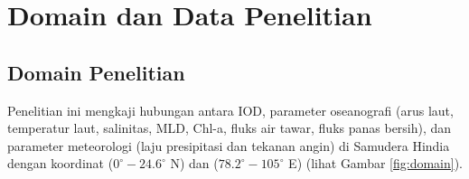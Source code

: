 \vspace{1.5pc}
\section[Domain dan Data Penelitian]{Domain dan Data Penelitian}
\begin{spacing}{1.5}
	\subsection[Domain Penelitian]{Domain Penelitian}
	Penelitian ini mengkaji hubungan antara IOD, parameter oseanografi (arus laut, temperatur laut, salinitas, MLD, Chl-a, fluks air tawar, fluks panas bersih), dan parameter meteorologi (laju presipitasi dan tekanan angin) di Samudera Hindia dengan koordinat ($0^\circ-24.6^\circ$ N) dan ($78.2^\circ-105^\circ$ E) (lihat Gambar \ref{fig:domain}).


\end{spacing}
